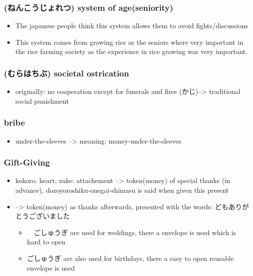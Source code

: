 \documentclass{article}
\newcommand\tabni[1][0.2cm]{\hspace*{#1}}
\begin{document}
\subsubsection{ (ねんこうじょれつ) \tabni system of age(seniority)}
\begin{itemize}%
\item The japanese people think this system allows them to avoid fights/discussions 
\item This system comes from growing rice as the seniors where very important in the rice farming society as the experience in rice growing was very important. \\
\end{itemize}
\subsubsection{(むらはちぶ) \tabni societal ostrication}
\begin{itemize}%
\item originally: no cooperation except for funerals and fires (かじ)--> traditional social punishment \\
\end{itemize}
\subsubsection{ \tabni bribe}
\begin{itemize}%
\item {} under-the-sleeves --> meaning: money-under-the-sleeves \\
\end{itemize}
\subsubsection{Gift-Giving}
\begin{itemize}
\item {} kokoro: heart, zuke: attachement	--> token(money) of special thanks (in advance),	dozoyoroshiku-onegai-shimasu is said when given this present
\item {} --> token(money) as thanks afterwards, presented with the words: どもありがとうございました
\begin{itemize}%
\item　ごしゅうぎ are used for weddings, there a envelope is used which is hard to open
\item ごしゅうぎ are also used for birthdays, there a easy to open reusable envelope is used \\
\end{itemize}
\end{itemize}
\end{document}
